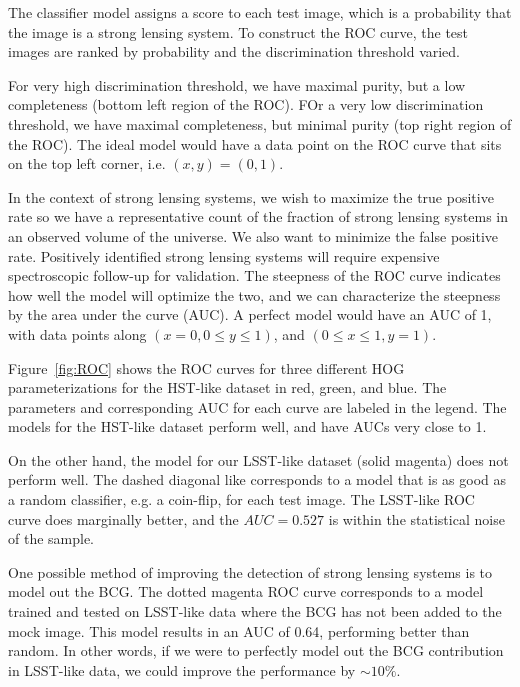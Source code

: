 \documentclass{emulateapj}
\begin{document}
The classifier model assigns a score to each test image, which is a
probability that the image is a strong lensing system.  To construct
the ROC curve, the test images are ranked by probability and the
discrimination threshold varied.  

For very high discrimination threshold, we have maximal purity, but a
low completeness (bottom left region of the ROC).  FOr a very low
discrimination threshold, we have maximal completeness, but minimal
purity (top right region of the ROC).  The ideal model would have a
data point on the ROC curve that sits on the top left corner,
i.e. $(x, y) = (0, 1)$.

In the context of strong lensing systems, we wish to maximize the true
positive rate so we have a representative count of the fraction of
strong lensing systems in an observed volume of the universe.  We also
want to minimize the false positive rate.  Positively identified
strong lensing systems will require expensive spectroscopic follow-up
for validation.  The steepness of the ROC curve indicates how well the
model will optimize the two, and we can characterize the steepness by
the area under the curve (AUC).  A perfect model would have an AUC of
1, with data points along $(x=0, 0\leq y\leq1)$, and $(0\leq x\leq 1,
y=1)$.

Figure~\ref{fig:ROC} shows the ROC curves for three different HOG
parameterizations for the HST-like dataset in red, green, and blue.
The parameters and corresponding AUC for each curve are labeled in the
legend.  The models for the HST-like dataset perform well, and have
AUCs very close to 1.  

On the other hand, the model for our LSST-like dataset (solid magenta)
does not perform well.  The dashed diagonal like corresponds to a
model that is as good as a random classifier, e.g. a coin-flip, for
each test image.  The LSST-like ROC curve does marginally better, and
the $AUC=0.527$ is within the statistical noise of the sample.  

One possible method of improving the detection of strong lensing
systems is to model out the BCG.  The dotted magenta ROC curve
corresponds to a model trained and tested on LSST-like data where the
BCG has not been added to the mock image.  This model results in an
AUC of 0.64, performing better than random.  In other words, if we
were to perfectly model out the BCG contribution in LSST-like data, we
could improve the performance by $\sim10\%$.
\end{document}

